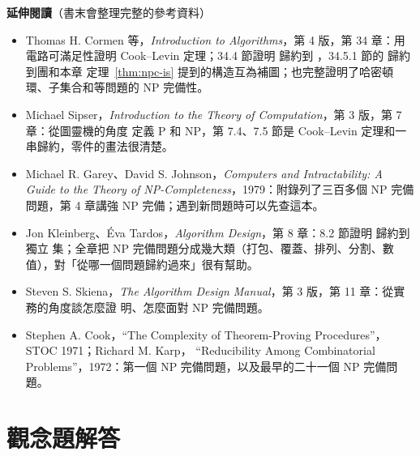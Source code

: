 \textbf{延伸閱讀}（書末會整理完整的參考資料）

\begin{itemize}
\item Thomas H. Cormen 等，\textit{Introduction to Algorithms}，第 4 版，第 34 章：用電路可滿足性證明
Cook--Levin 定理；34.4 節證明  歸約到 ，34.5.1 節的  歸約到團和本章
定理~\ref{thm:npc-is} 提到的構造互為補圖；也完整證明了哈密頓環、子集合和等問題的 NP 完備性。
\item Michael Sipser，\textit{Introduction to the Theory of Computation}，第 3 版，第 7 章：從圖靈機的角度
定義 P 和 NP，第 7.4、7.5 節是 Cook--Levin 定理和一串歸約，零件的畫法很清楚。
\item Michael R. Garey、David S. Johnson，\textit{Computers and Intractability: A Guide to the Theory of
NP-Completeness}，1979：附錄列了三百多個 NP 完備問題，第 4 章講強 NP 完備；遇到新問題時可以先查這本。
\item Jon Kleinberg、Éva Tardos，\textit{Algorithm Design}，第 8 章：8.2 節證明  歸約到獨立
集；全章把 NP 完備問題分成幾大類（打包、覆蓋、排列、分割、數值），對「從哪一個問題歸約過來」很有幫助。
\item Steven S. Skiena，\textit{The Algorithm Design Manual}，第 3 版，第 11 章：從實務的角度談怎麼證
明、怎麼面對 NP 完備問題。
\item Stephen A. Cook，``The Complexity of Theorem-Proving Procedures''，STOC 1971；Richard M. Karp，
``Reducibility Among Combinatorial Problems''，1972：第一個 NP 完備問題，以及最早的二十一個 NP 完備問題。
\end{itemize}

\section*{觀念題解答}

